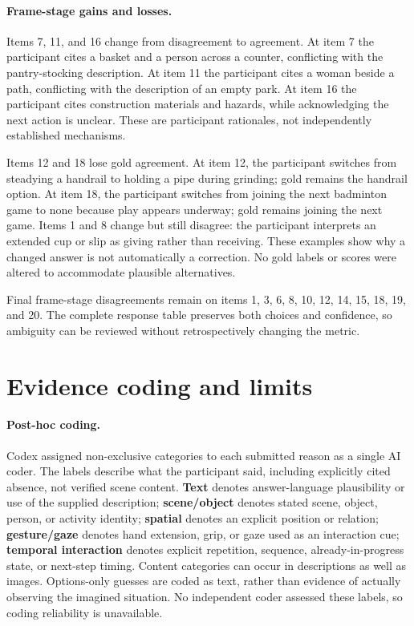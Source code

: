 \paragraph{Frame-stage gains and losses.} Items 7, 11, and 16 change from disagreement to agreement. At item 7 the participant cites a basket and a person across a counter, conflicting with the pantry-stocking description. At item 11 the participant cites a woman beside a path, conflicting with the description of an empty park. At item 16 the participant cites construction materials and hazards, while acknowledging the next action is unclear. These are participant rationales, not independently established mechanisms.

Items 12 and 18 lose gold agreement. At item 12, the participant switches from steadying a handrail to holding a pipe during grinding; gold remains the handrail option. At item 18, the participant switches from joining the next badminton game to none because play appears underway; gold remains joining the next game. Items 1 and 8 change but still disagree: the participant interprets an extended cup or slip as giving rather than receiving. These examples show why a changed answer is not automatically a correction. No gold labels or scores were altered to accommodate plausible alternatives.

Final frame-stage disagreements remain on items 1, 3, 6, 8, 10, 12, 14, 15, 18, 19, and 20. The complete response table preserves both choices and confidence, so ambiguity can be reviewed without retrospectively changing the metric.

\clearpage
\section*{Evidence coding and limits}
\paragraph{Post-hoc coding.} Codex assigned non-exclusive categories to each submitted reason as a single AI coder. The labels describe what the participant said, including explicitly cited absence, not verified scene content. \textbf{Text} denotes answer-language plausibility or use of the supplied description; \textbf{scene/object} denotes stated scene, object, person, or activity identity; \textbf{spatial} denotes an explicit position or relation; \textbf{gesture/gaze} denotes hand extension, grip, or gaze used as an interaction cue; \textbf{temporal interaction} denotes explicit repetition, sequence, already-in-progress state, or next-step timing. Content categories can occur in descriptions as well as images. Options-only guesses are coded as text, rather than evidence of actually observing the imagined situation. No independent coder assessed these labels, so coding reliability is unavailable.


